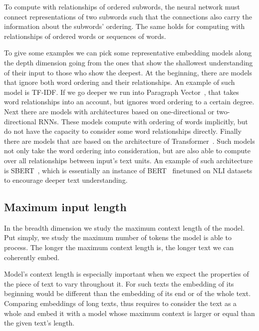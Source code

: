 To compute with relationships of ordered subwords, the neural network must
connect representations of two subwords such that the connections also carry
the information about the subwords' ordering. The same holds for computing with
relationships of ordered words or sequences of words.

To give some examples we can pick some representative embedding models along
the depth dimension going from the ones that show the shallowest understanding
of their input to those who show the deepest. At the beginning, there are
models that ignore both word ordering and their relationships. An example of
such model is TF-IDF. If we go deeper we run into Paragraph
Vector~\cite{le2014distributed}, that takes word relationships into an account,
but ignores word ordering to a certain degree. Next there are models with
architectures based on one-directional or two-directional RNNs. These models
compute with ordering of words implicitly, but do not have the capacity to
consider some word relationships directly. Finally there are models that are
based on the architecture of Transformer~\cite{vaswani2017attention}. Such
models not only take the word ordering into consideration, but are also able to
compute over all relationships between input's text units. An example of such
architecture is SBERT~\cite{reimers2019sentence}, which is essentially an
instance of BERT~\cite{devlin2019bert} finetuned on NLI datasets to encourage
deeper text understanding.

\subsection{Maximum input length}

In the breadth dimension we study the maximum context length of the model. Put
simply, we study the maximum number of tokens the model is able to process. The
longer the maximum context length is, the longer text we can coherently embed.

Model's context length is especially important when we expect the properties of
the piece of text to vary throughout it. For such texts the embedding of its
beginning would be different than the embedding of its end or of the whole
text. Comparing embeddings of long texts, thus requires to consider the text as
a whole and embed it with a model whose maximum context is larger or equal than
the given text's length.

